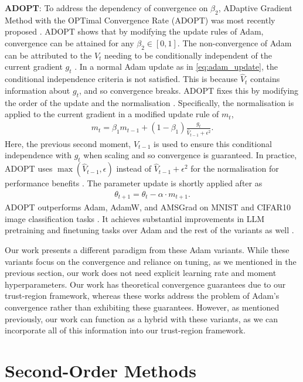 \textbf{ADOPT}: To address the dependency of convergence on $\beta_2$, ADaptive Gradient Method with the OPTimal Convergence Rate (ADOPT) was most recently proposed \citep{taniguchi2024adopt}. ADOPT shows that by modifying the update rules of Adam, convergence can be attained for any $\beta_2 \in [0, 1]$. The non-convergence of Adam can be attributed to the $V_t$ needing to be conditionally independent of the current gradient $g_t$ \citep{taniguchi2024adopt}. In a normal Adam update as in \cref{eq:adam_update}, the conditional independence criteria is not satisfied. This is because $\hat{V}_t$ contains information about $g_t$, and so convergence breaks. 
ADOPT fixes this by modifying the order of the update and the normalisation \citep{taniguchi2024adopt}. Specifically, the normalisation is applied to the current gradient in a modified update rule of $m_t$, 
\begin{align}
    m_t = \beta_1 m_{t-1} + (1 - \beta_1) \frac{g_t}{\hat{V}_{t-1} + \epsilon^2}.
\end{align}
Here, the previous second moment, $V_{t-1}$ is used to ensure this conditional independence with $g_t$ when scaling and so convergence is guaranteed. In practice, ADOPT uses $\max(\hat{V}_{t-1}, \epsilon)$ instead of $\hat{V}_{t-1} + \epsilon^2$ for the normalisation for performance benefits \citep{taniguchi2024adopt}. The parameter update is shortly applied after as
\begin{align}
    \theta_{t+1} = \theta_{t} - \alpha \cdot m_{t+1}.
\end{align}
ADOPT outperforms Adam, AdamW, and AMSGrad on MNIST and CIFAR10 image classification tasks \citep{taniguchi2024adopt}.
It achieves substantial improvements in LLM pretraining and finetuning tasks over Adam and the rest of the variants as well \citep{taniguchi2024adopt}. 

Our work presents a different paradigm from these Adam variants. While these variants focus on the convergence and reliance on tuning, as we mentioned in the previous section, our work does not need explicit learning rate and moment hyperparameters. Our work has theoretical convergence guarantees due to our trust-region framework, whereas these works address the problem of Adam's convergence rather than exhibiting these guarantees. However, as mentioned previously, our work can function as a hybrid with these variants, as we can incorporate all of this information into our trust-region framework.

\section{Second-Order Methods}
\label{sec:second_order_methods}

